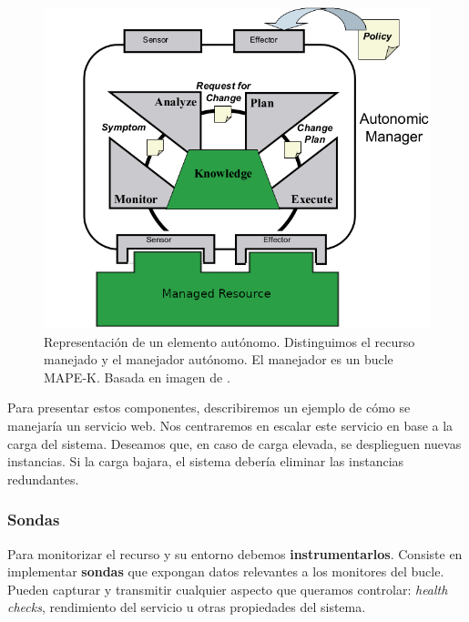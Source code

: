 \begin{figure}[h]
  \centering
  \includegraphics[scale=2]{cap_contexto_tecnologico/images/autonomic-element}
  \caption[Representación de un elemento autónomo. Distinguimos el recurso manejado y el manejador autónomo. El manejador es un bucle MAPE-K (\emph{Monitor}, \emph{Analysis}, \emph{Planification}, \emph{Execution} y \emph{Knowledge})]{Representación de un elemento autónomo. Distinguimos el recurso manejado y el manejador autónomo. El manejador es un bucle MAPE-K. Basada en imagen de \cite{ibmcorporationArchitecturalBlueprintAutonomic2006}.}
  \label{fig:autonomic-element}
\end{figure}

Para presentar estos componentes, describiremos un ejemplo de cómo se manejaría un servicio web. Nos centraremos en escalar este servicio en base a la carga del sistema. Deseamos que, en caso de carga elevada, se desplieguen nuevas instancias. Si la carga bajara, el sistema debería eliminar las instancias redundantes.

\subsubsection{Sondas}

Para monitorizar el recurso y su entorno debemos \textbf{instrumentarlos}. Consiste en implementar \textbf{sondas} que expongan datos relevantes a los monitores del bucle. Pueden capturar y transmitir cualquier aspecto que queramos controlar: \emph{health checks}, rendimiento del servicio u otras propiedades del sistema.


